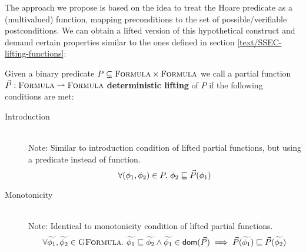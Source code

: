 %
%
%
%

The approach we propose is based on the idea to treat the Hoare predicate as a (multivalued) function, mapping preconditions to the set of possible/verifiable postconditions.
We can obtain a lifted version of this hypothetical construct and demand certain properties similar to the ones defined in section \ref{text/SSEC-lifting-functions}:

\begin{definition}
    Given a binary predicate $P \subseteq \textsc{Formula} \times \textsc{Formula}$ we call a partial function $\vec{P} : \textsc{Formula} \rightharpoonup \textsc{Formula}$ \textbf{deterministic lifting} of $P$ if the following conditions are met:
    \begin{description}
        \item[Introduction]~\\
        Note: Similar to introduction condition of lifted partial functions, but using a predicate instead of function.
        \begin{displaymath}
        \forall (\phi_1, \phi_2) \in P.~ \phi_2 \sqsubseteq \vec{P}(\phi_1)
        \end{displaymath}
        
        \item[Monotonicity]~\\
        Note: Identical to monotonicity condition of lifted partial functions. %
        \begin{displaymath}
        \forall \widetilde{\phi_1}, \widetilde{\phi_2} \in \textsc{GFormula}.~ \widetilde{\phi_1} \sqsubseteq \widetilde{\phi_2} \wedge \widetilde{\phi_1} \in \textsf{dom}(\vec{P}) \implies \vec{P}(\widetilde{\phi_1}) \sqsubseteq \vec{P}(\widetilde{\phi_2})
        \end{displaymath}
    \end{description}
\end{definition}

